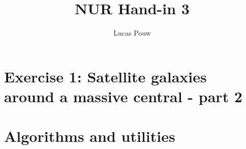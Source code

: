 \documentclass[a4paper,10pt]{article}
\title{NUR Hand-in 3}
\author{Lucas Pouw}
\begin{document}
\maketitle

\section{Exercise 1: Satellite galaxies around a massive central - part 2}









\section{Algorithms and utilities}


\end{document}
